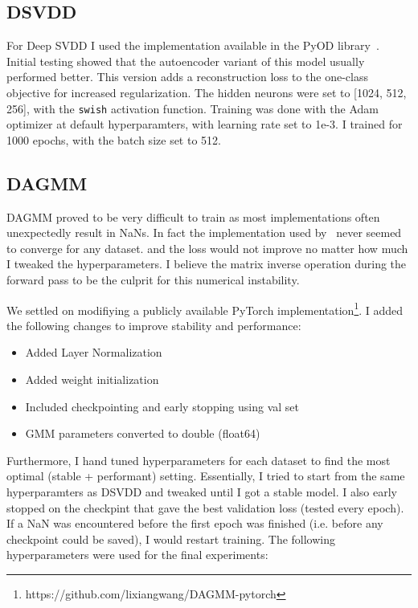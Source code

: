 \subsection*{DSVDD}
For Deep SVDD I used the implementation available in the PyOD library~\cite{zhao2019pyod}. Initial testing showed that the autoencoder variant of this model usually performed better. This version adds a reconstruction loss to the one-class objective for increased regularization. The hidden neurons were set to [1024, 512, 256], with the \texttt{swish} activation function. Training was done with the Adam optimizer at default hyperparamters, with learning rate set to 1e-3. I trained for 1000 epochs, with the batch size set to 512.

\subsection*{DAGMM}
DAGMM proved to be very difficult to train as most implementations often unexpectedly result in NaNs. In fact the implementation used by~\cite{han2022adbench} never seemed to converge for any dataset. and the loss would not improve no matter how much I tweaked the hyperparameters. I believe the matrix inverse operation during the forward pass to be the culprit for this numerical instability. 

We settled on modifiying a publicly available PyTorch implementation\footnote{https://github.com/lixiangwang/DAGMM-pytorch}. I added the following changes to improve stability and performance:

\begin{itemize}
    \item Added Layer Normalization
    \item Added weight initialization
    \item Included checkpointing and early stopping using val set
    \item GMM parameters converted to double (float64)
\end{itemize}

Furthermore, I hand tuned hyperparameters for each dataset to find the most optimal (stable + performant) setting. Essentially, I tried to start from the same hyperparamters as DSVDD and tweaked until I got a stable model. I also early stopped on the checkpint that gave the best validation loss (tested every epoch). If a NaN was encountered before the first epoch was finished (i.e. before any checkpoint could be saved), I would restart training. The following hyperparameters were used for the final experiments:

